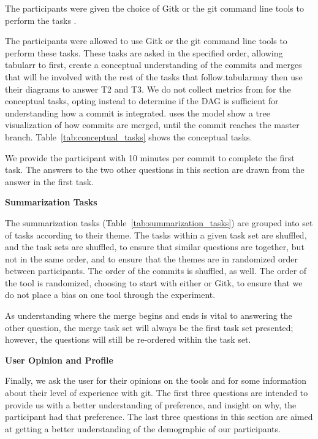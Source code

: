 The participants were given the choice of Gitk or the git command line
tools to perform the tasks .

The participants were allowed to use Gitk or the git command line tools
to perform these tasks. These tasks are asked in the specified order,
allowing tabularr to first, create a conceptual understanding of the
commits and merges that will be involved with the rest of the tasks that
follow.tabularmay then use their diagrams to answer T2 and T3. We do not
collect metrics from \tool for the conceptual tasks, opting instead to
determine if the DAG is sufficient for understanding how a commit is
integrated. \tool uses the \mt model show a tree visualization of how
commits are merged, until the commit reaches the master branch.
Table~\ref{tab:conceptual_tasks} shows the conceptual tasks.


We provide the participant with 10 minutes per commit to complete the
first task. The answers to the two other questions in this section are
drawn from the answer in the first task.

\textbf{Summarization Tasks}



The summarization tasks (Table~\ref{tab:summarization_tasks}) are
grouped into  set of tasks according to their theme. The
tasks within a given task set are shuffled, and the task sets are
shuffled, to ensure that similar questions are together, but not in the
same order, and to ensure that the themes are in randomized order
between participants. The order of the commits is shuffled, as well. The
order of the tool is randomized, choosing to start with either \tool or
Gitk, to ensure that we do not place a bias on one tool through the
experiment.

As understanding where the merge begins and ends is vital to answering
the other question, the merge task set will always be the first task set
presented; however, the questions will still be re-ordered within the
task set.

\textbf{User Opinion and Profile}

Finally, we ask the user for their opinions on the tools and for some
information about their level of experience with git.   The first three questions are intended
to provide us with a better understanding of preference, and insight on
why, the participant had that preference.  The last three questions in
this section are aimed at getting a better understanding of the
demographic of our participants.

